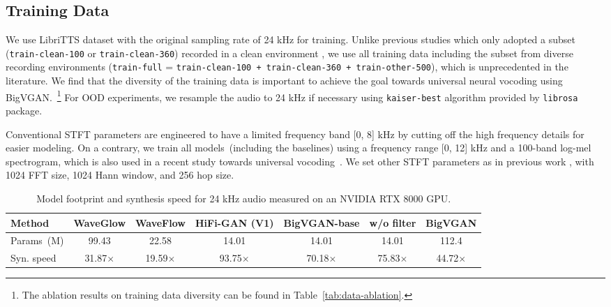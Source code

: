 \documentclass{article} \usepackage{iclr2023_conference,times}
\theoremstyle{plain}
\theoremstyle{definition}
\theoremstyle{remark}
\begin{document}
\vspace{-.2cm}
\subsection{Training Data}
\vspace{-.1cm}
We use LibriTTS \citep{zen2019libritts} dataset with the original sampling rate of 24 kHz for training. Unlike previous studies which only adopted a subset (\texttt{train-clean-100} or \texttt{train-clean-360}) recorded in a clean environment \citep{jang2020universal, jang2021univnet, 
albadawy2021vocbench}, we use all training data including the subset from diverse recording environments (\texttt{train-full} = \texttt{train-clean-100 + train-clean-360 + train-other-500}), which is unprecedented in the literature. We find that the diversity of the training data is important to achieve the goal towards universal neural vocoding using BigVGAN.~\footnote{The ablation results on training data diversity can be found in Table~\ref{tab:data-ablation}.}
For OOD experiments, we resample the audio to 24 kHz if necessary using \texttt{kaiser-best} algorithm provided by \texttt{librosa} package.

Conventional STFT parameters are engineered to have a limited frequency band [0, 8] kHz by cutting off the high frequency details for easier modeling. On a contrary, we train all models~(including the baselines) using a frequency range [0, 12] kHz and a 100-band log-mel spectrogram, which is also used in a recent study towards universal vocoding~\citep{jang2021univnet}. We set other STFT parameters as in previous work \citep{kong2020hifi}, with 1024 FFT size, 1024 Hann window, and 256 hop size.


\begin{table}[t]
\vspace{-.2cm}
\caption{\footnotesize 
Model footprint and synthesis speed for 24 kHz audio measured on an NVIDIA RTX 8000 GPU. 
}
\label{tab:model_comparison}
\vspace{-0.1cm}
\begin{center}
\begin{small}
\begin{tabular}{l|c|c|c|cc|c}
\toprule
Method & WaveGlow & WaveFlow & HiFi-GAN (V1)  & BigVGAN-base &  w/o filter  & BigVGAN  \\
\midrule
Params~(M) & 99.43 & 22.58 & 14.01 & 14.01 & 14.01  & 112.4 \\
Syn. speed & 31.87$\times$ & 19.59$\times$  & 93.75$\times$ & 70.18$\times$  & 75.83$\times$ & 44.72$\times$ \\
\bottomrule
\end{tabular}
\end{small}
\end{center}
\vspace{-0.5cm}
\end{table}
\end{document}
